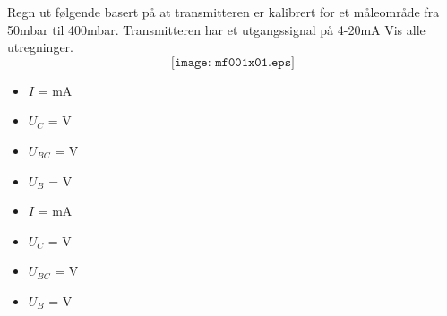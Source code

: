 

Regn ut følgende basert på at transmitteren er kalibrert for et måleområde fra 50mbar til 400mbar. Transmitteren har et utgangssignal på 4-20mA 
Vis alle utregninger. 
$$\texttt{[image: mf001x01.eps]}$$

\begin{itemize}
\item{} $I$ = \underbar{\hskip 50pt} mA
\vskip 10pt
\item{} $U_{C}$ = \underbar{\hskip 50pt} V 
\vskip 10pt
\item{} $U_{BC}$ = \underbar{\hskip 50pt} V 
\vskip 10pt
\item{} $U_{B}$ = \underbar{\hskip 50pt} V 
\end{itemize}







\begin{itemize}
\item{} $I$ =  mA
\vskip 10pt
\item{} $U_{C}$ =  V 
\vskip 10pt
\item{} $U_{BC}$ =  V 
\vskip 10pt
\item{} $U_{B}$ =  V 
\end{itemize}











